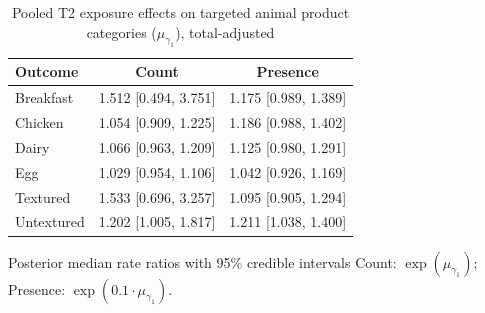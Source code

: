\begin{table}[H]
\centering
\caption{Pooled T2 exposure effects on targeted animal product categories ($\mu_{\gamma_1}$), total-adjusted}
\label{tab:a2_t2_mu_gamma_adj}
\begin{tabular}{lcc}
\toprule
Outcome & Count & Presence \\
\midrule
Breakfast & 1.512 [0.494, 3.751] & 1.175 [0.989, 1.389] \\
Chicken & 1.054 [0.909, 1.225] & 1.186 [0.988, 1.402] \\
Dairy & 1.066 [0.963, 1.209] & 1.125 [0.980, 1.291] \\
Egg & 1.029 [0.954, 1.106] & 1.042 [0.926, 1.169] \\
Textured & 1.533 [0.696, 3.257] & 1.095 [0.905, 1.294] \\
Untextured & 1.202 [1.005, 1.817] & 1.211 [1.038, 1.400] \\
\bottomrule
\end{tabular}
\par\smallskip\footnotesize Posterior median rate ratios with 95\% credible intervals Count: $\exp(\mu_{\gamma_1})$; Presence: $\exp(0.1 \cdot \mu_{\gamma_1})$.
\end{table}
